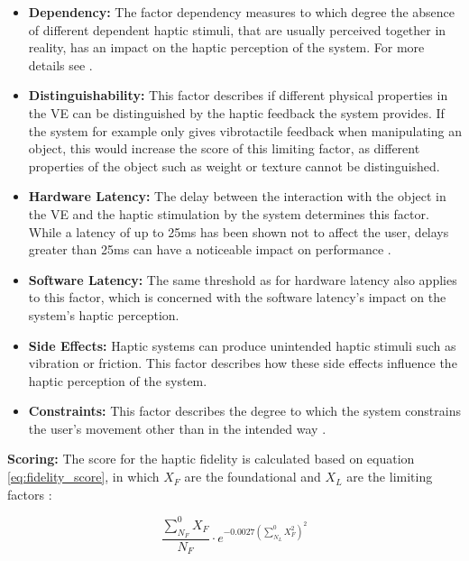 \begin{itemize}
    \item \textbf{Dependency:}
    The factor dependency measures to which degree the absence of different dependent haptic stimuli, that are usually perceived together in reality, has an impact on the haptic perception of the system. For more details see \cite{Muender2022HapticReality}.
    
    \item \textbf{Distinguishability:}
    This factor describes if different physical properties in the VE can be distinguished by the haptic feedback the system provides. If the system for example only gives vibrotactile feedback when manipulating an object, this would increase the score of this limiting factor, as different properties of the object such as weight or texture cannot be distinguished. 

    \item \textbf{Hardware Latency:}
    The delay between the interaction with the object in the VE and the haptic stimulation by the system determines this factor. While a latency of up to 25ms has been shown not to affect the user, delays greater than 25ms can have a noticeable impact on performance \cite{Muender2022HapticReality}.
    
    \item \textbf{Software Latency:}
    The same threshold as for hardware latency also applies to this factor, which is concerned with the software latency's impact on the system's haptic perception.

    \item \textbf{Side Effects:}
    Haptic systems can produce unintended haptic stimuli such as vibration or friction. This factor describes how these side effects influence the haptic perception of the system. 

    \item \textbf{Constraints:}
    This factor describes the degree to which the system constrains the user's movement other than in the intended way \cite{Muender2022HapticReality}.
    
\end{itemize}

\textbf{Scoring:}
The score for the haptic fidelity is calculated based on equation \ref{eq:fidelity_score}, in which $X_F$ are the foundational and $X_L$ are the limiting factors \cite{Muender2022HapticReality}:

\begin{equation}
    \frac{\sum_{N_F}^{0} X_F}{N_F} \cdot e^{-0.0027 \left(\sum_{N_L}^{0} X_F^2 \right)^2}
    \label{eq:fidelity_score}
\end{equation}


